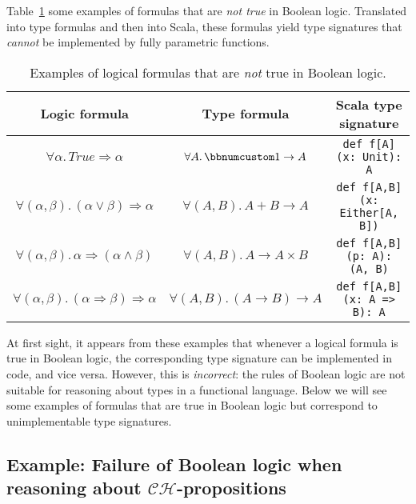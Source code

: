 Table~\ref{tab:Logical-formulas-not-Boolean-theorems} some examples
of formulas that are \emph{not true} in Boolean logic. Translated
into type formulas and then into Scala, these formulas yield type
signatures that \emph{cannot} be implemented by fully parametric functions.

\begin{table}
\begin{centering}
\begin{tabular}{|c|c|c|}
\hline 
\textbf{\small{}Logic formula} & \textbf{\small{}Type formula} & \textbf{\small{}Scala type signature}\tabularnewline
\hline 
\hline 
{\footnotesize{}$\forall\alpha.\,True\Rightarrow\alpha$} & {\footnotesize{}$\forall A.\,\bbnum 1\rightarrow A$} & \lstinline!def f[A](x: Unit): A!\tabularnewline
\hline 
{\footnotesize{}$\forall(\alpha,\beta).\,(\alpha\vee\beta)\Rightarrow\alpha$} & {\footnotesize{}$\forall(A,B).\,A+B\rightarrow A$} & \lstinline!def f[A,B](x: Either[A, B])!\tabularnewline
\hline 
{\footnotesize{}$\forall(\alpha,\beta).\,\alpha\Rightarrow(\alpha\wedge\beta)$} & {\footnotesize{}$\forall(A,B).\,A\rightarrow A\times B$} & \lstinline!def f[A,B](p: A): (A, B)!\tabularnewline
\hline 
{\footnotesize{}$\forall(\alpha,\beta).\,(\alpha\Rightarrow\beta)\Rightarrow\alpha$} & {\footnotesize{}$\forall(A,B).\,(A\rightarrow B)\rightarrow A$} & \lstinline!def f[A,B](x: A => B): A!\tabularnewline
\hline 
\end{tabular}
\par\end{centering}
\caption{Examples of logical formulas that are \emph{not} true in Boolean logic.\label{tab:Logical-formulas-not-Boolean-theorems}}
\end{table}

At first sight, it appears from these examples that whenever a logical
formula is true in Boolean logic, the corresponding type signature
can be implemented in code, and vice versa. However, this is \emph{incorrect}:
the rules of Boolean logic are not suitable for reasoning about types
in a functional language. Below we will see some examples of formulas
that are true in Boolean logic but correspond to unimplementable type
signatures.

\subsection{Example: Failure of Boolean logic when reasoning about $\mathcal{CH}$-propositions\label{subsec:Example:-Failure-of-Boolean-logic}}

